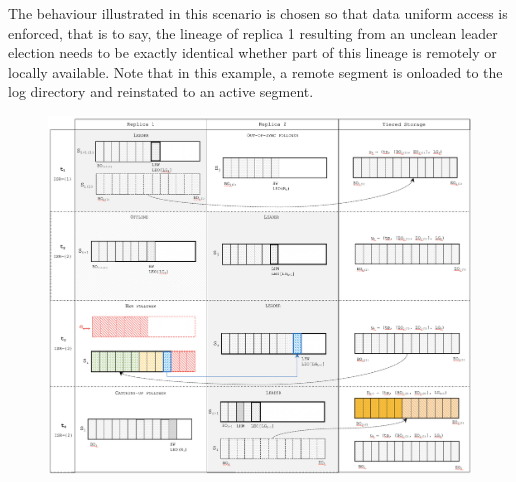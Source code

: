 \documentclass{article}
\begin{document}
The behaviour illustrated in this scenario is chosen so that data uniform access is enforced, that is to say, the lineage of replica 1 resulting from an unclean leader election needs to be exactly identical whether part of this lineage is remotely or locally available. Note that in this example, a remote segment is onloaded to the log directory and reinstated to an active segment.

\begin{figure}[h!]
	\includegraphics[scale=0.4]{unclean1.png}
	\label{fig:simple-example}
\end{figure}
\end{document}
